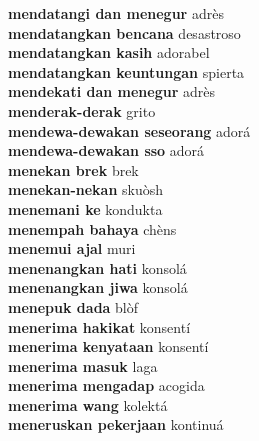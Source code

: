 \textbf{ mendatangi dan menegur  } adrès \\
\textbf{ mendatangkan bencana  } desastroso \\
\textbf{ mendatangkan kasih  } adorabel \\
\textbf{ mendatangkan keuntungan  } spierta \\
\textbf{ mendekati dan menegur  } adrès \\
\textbf{ menderak-derak  } grito \\
\textbf{ mendewa-dewakan seseorang  } adorá \\
\textbf{ mendewa-dewakan sso  } adorá \\
\textbf{ menekan brek  } brek \\
\textbf{ menekan-nekan  } skuòsh \\
\textbf{ menemani ke  } kondukta \\
\textbf{ menempah bahaya  } chèns \\
\textbf{ menemui ajal  } muri \\
\textbf{ menenangkan hati  } konsolá \\
\textbf{ menenangkan jiwa  } konsolá \\
\textbf{ menepuk dada  } blòf \\
\textbf{ menerima hakikat  } konsentí \\
\textbf{ menerima kenyataan  } konsentí \\
\textbf{ menerima masuk  } laga \\
\textbf{ menerima mengadap  } acogida \\
\textbf{ menerima wang  } kolektá \\
\textbf{ meneruskan pekerjaan  } kontinuá \\
